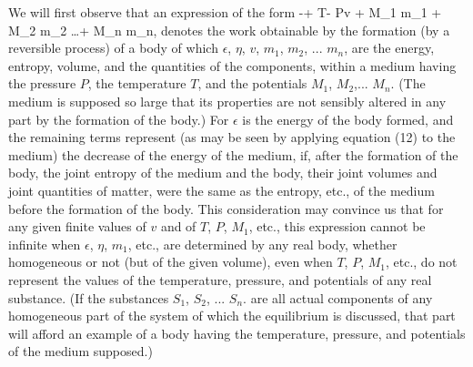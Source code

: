 \documentclass[12pt]{memoir}
\begin{document}
We will first observe that an expression of the form
\eqs-\epsilon + T\eta - Pv + M_1 m_1 + M_2 m_2 \dots + M_n m_n,    \label{54}\eqe
denotes the work obtainable by the formation (by a reversible process) of a body of which $\epsilon$, $\eta$, $v$, $m_1$, $m_2$, ... $m_n$, are the energy, entropy, volume, and the quantities of the components, within a medium having the pressure $P$, the temperature $T$, and the potentials $M_1$, $M_2$,... $M_n$. (The medium is supposed so large that its properties are not sensibly altered in any part by the formation of the body.) For $\epsilon$ is the energy of the body formed, and the remaining terms represent (as may be seen by applying equation (12) to the medium) the decrease of the energy of the medium, if, after the formation of the body, the joint entropy of the medium and the body, their joint volumes and joint quantities of matter, were the same as the entropy, etc., of the medium before the formation of the body. This consideration may convince us that for any given finite values of $v$ and of $T$, $P$, $M_1$, etc., this expression cannot be infinite when $\epsilon$, $\eta$, $m_1$, etc., are determined by any real body, whether homogeneous or not (but of the given volume), even when $T$, $P$, $M_1$, etc., do not represent the values of the temperature, pressure, and potentials of any real substance. (If the substances $S_1$, $S_2$, ... $S_n$. are all actual components of any homogeneous part of the system of which the equilibrium is discussed, that part will afford an example of a body having the temperature, pressure, and potentials of the medium supposed.)
\end{document}
